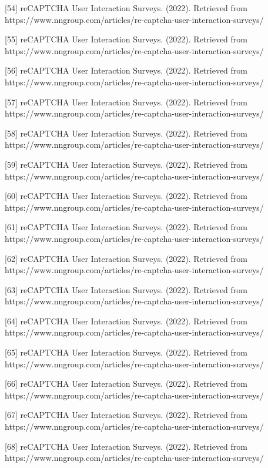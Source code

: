 [54] reCAPTCHA User Interaction Surveys. (2022). Retrieved from https://www.nngroup.com/articles/re-captcha-user-interaction-surveys/ 

[55] reCAPTCHA User Interaction Surveys. (2022). Retrieved from https://www.nngroup.com/articles/re-captcha-user-interaction-surveys/ 

[56] reCAPTCHA User Interaction Surveys. (2022). Retrieved from https://www.nngroup.com/articles/re-captcha-user-interaction-surveys/ 

[57] reCAPTCHA User Interaction Surveys. (2022). Retrieved from https://www.nngroup.com/articles/re-captcha-user-interaction-surveys/ 

[58] reCAPTCHA User Interaction Surveys. (2022). Retrieved from https://www.nngroup.com/articles/re-captcha-user-interaction-surveys/ 

[59] reCAPTCHA User Interaction Surveys. (2022). Retrieved from https://www.nngroup.com/articles/re-captcha-user-interaction-surveys/ 

[60] reCAPTCHA User Interaction Surveys. (2022). Retrieved from https://www.nngroup.com/articles/re-captcha-user-interaction-surveys/ 

[61] reCAPTCHA User Interaction Surveys. (2022). Retrieved from https://www.nngroup.com/articles/re-captcha-user-interaction-surveys/ 

[62] reCAPTCHA User Interaction Surveys. (2022). Retrieved from https://www.nngroup.com/articles/re-captcha-user-interaction-surveys/ 

[63] reCAPTCHA User Interaction Surveys. (2022). Retrieved from https://www.nngroup.com/articles/re-captcha-user-interaction-surveys/ 

[64] reCAPTCHA User Interaction Surveys. (2022). Retrieved from https://www.nngroup.com/articles/re-captcha-user-interaction-surveys/ 

[65] reCAPTCHA User Interaction Surveys. (2022). Retrieved from https://www.nngroup.com/articles/re-captcha-user-interaction-surveys/ 

[66] reCAPTCHA User Interaction Surveys. (2022). Retrieved from https://www.nngroup.com/articles/re-captcha-user-interaction-surveys/ 

[67] reCAPTCHA User Interaction Surveys. (2022). Retrieved from https://www.nngroup.com/articles/re-captcha-user-interaction-surveys/ 

[68] reCAPTCHA User Interaction Surveys. (2022). Retrieved from https://www.nngroup.com/articles/re-captcha-user-interaction-surveys/ 

